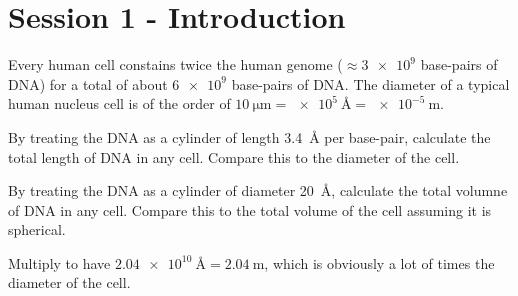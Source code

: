 \section{Session 1 - Introduction}

\begin{problem} Every human cell constains twice the human genome ($\approx \num{3e9}$ base-pairs of DNA) for a total of about $\num{6e9}$ base-pairs of DNA. The diameter of a typical human nucleus cell is of the order of $\SI{10}{\micro\metre} = \SI{e5}{\angstrom} = \SI{e-5}{\metre}$.

\ppart By treating the DNA as a cylinder of length \SI{3.4}{\angstrom} per base-pair, calculate the total length of DNA in any cell. Compare this to the diameter of the cell.

\ppart By treating the DNA as a cylinder of diameter \SI{20}{\angstrom}, calculate the total volumne of DNA in any cell. Compare this to the total volume of the cell assuming it is spherical.

\solution

\spart

Multiply to have $\SI{2.04e10}{\angstrom} = \SI{2.04}{\metre}$, which is obviously a lot of times the diameter of the cell.

\spart



\end{problem}

